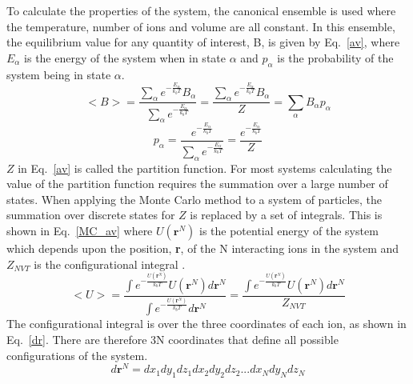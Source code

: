 \documentclass[11pt, twoside]{report}
\begin{document}
To calculate the properties of the system, the canonical ensemble is used where the temperature, number of ions and volume are all constant. In this ensemble, the equilibrium value for any quantity of interest, B, is given by Eq.~\ref{av}, where $E_\alpha$ is the energy of the system when in state $\alpha$ and $p_\alpha$ is the probability of the system being in state $\alpha$.
\begin{equation}\label{av}
<B> = \frac{ \sum_\alpha e^{-\frac{E_\alpha}{k_bT}} B_\alpha}{ \sum_\alpha e^{-\frac{E_\alpha}{k_bT}}} = \frac{ \sum_\alpha e^{-\frac{E_\alpha}{k_bT}} B_\alpha}{Z} = \sum_\alpha B_\alpha p_\alpha
\end{equation}
\begin{equation}\label{prob}
p_\alpha = \frac{  e^{-\frac{E_\alpha}{k_bT}} }{ \sum_{\alpha} e^{-\frac{E_\alpha}{k_bT}}} =\frac{  e^{-\frac{E_\alpha}{k_bT}} }{Z}
\end{equation}
$Z$ in Eq.~\ref{av} is called the partition function. For most systems calculating the value of the partition function requires the summation over a large number of states. When applying the Monte Carlo method to a system of particles, the summation over discrete states for $Z$ is replaced by a set of integrals. This is shown in Eq.~\ref{MC_av} where $U(\mathbf{r}^N)$ is the potential energy of the system which depends upon the position, \textbf{r}, of the N interacting ions in the system and $Z_{NVT}$ is the configurational integral \cite{Lesar3}.
\begin{equation}\label{MC_av}
<U> = \frac{ \int e^{-\frac{U(\mathbf{r}^N)}{k_bT}} U(\mathbf{r}^N) d\mathbf{r}^N}{\int e^{-\frac{U(\mathbf{r}^N)}{k_bT}} d\mathbf{r}^N}  = \frac{  \int e^{-\frac{U(\mathbf{r}^N)}{k_bT}} U(\mathbf{r}^N) d\mathbf{r}^N}{Z_{NVT}} 
\end{equation}
The configurational integral is over the three coordinates of each ion, as shown in Eq.~\ref{dr}. There are therefore 3N coordinates that define all possible configurations of the system.
\begin{equation}d \mathbf{r}^N = dx_1 dy_1 dz_1 dx_2 dy_2 dz_2... dx_N dy_N dz_N\end{equation}\label{dr}
\end{document}
